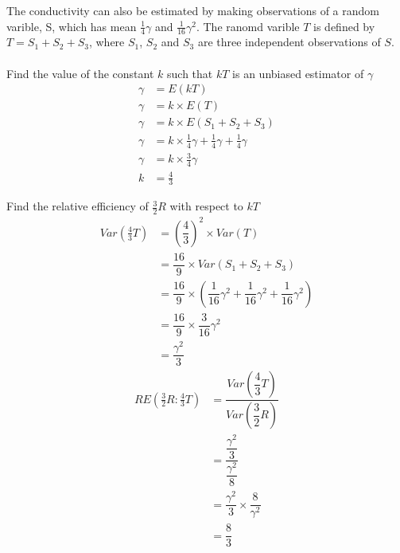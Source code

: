\begin{example}
            \begin{step}{The conductivity can also be estimated by making observations of a random varible, S, which has mean $\frac{1}{4}\gamma$ and $\frac{1}{16}\gamma^2$. The ranomd varible $T$ is defined by $T = S_1 + S_2 + S_3$, where $S_1$, $S_2$ and $S_3$ are three independent observations of $S$.\\\\Find the value of the constant $k$ such that $kT$ is an unbiased estimator of $\gamma$}
                \begin{align*}
                    \gamma &= E(kT)                                                                 \\
                    \gamma &= k \times E(T)                                                         \\
                    \gamma &= k \times E(S_1 + S_2 + S_3)                                           \\
                    \gamma &= k \times \frac{1}{4}\gamma + \frac{1}{4}\gamma + \frac{1}{4}\gamma    \\
                    \gamma &= k \times \frac{3}{4}\gamma                                            \\
                    k &= \frac{4}{3}
                \end{align*}
            \end{step}

            \begin{step}{Find the relative efficiency of $\frac{3}{2}R$ with respect to $kT$}
                \begin{align*}
                Var\left(\frac{4}{3}T\right) &= \left(\dfrac{4}{3}\right)^2 \times Var(T)       \\
                                            &= \dfrac{16}{9} \times Var(S_1 + S_2 + S_3)       \\
                                            &= \dfrac{16}{9} \times (\dfrac{1}{16}\gamma^2 + \dfrac{1}{16}\gamma^2 + \dfrac{1}{16}\gamma^2)                             \\
                                            &= \dfrac{16}{9} \times \dfrac{3}{16}\gamma^2      \\
                                            &= \dfrac{\gamma^2}{3}
                \end{align*}
                \begin{align*}
                    RE\left(\frac{3}{2}R : \frac{4}{3}T\right) &= \dfrac{Var\left(\dfrac{4}{3}T\right)}{ Var\left(\dfrac{3}{2}R\right)} \\
                    &= \dfrac{\dfrac{\gamma^2}{3}}{\dfrac{\gamma^2}{8}}      \\
                    &= \dfrac{\gamma^2}{3} \times \dfrac{8}{\gamma^2}        \\
                    &= \dfrac{8}{3}
                \end{align*}
            \end{step}


\end{example}
